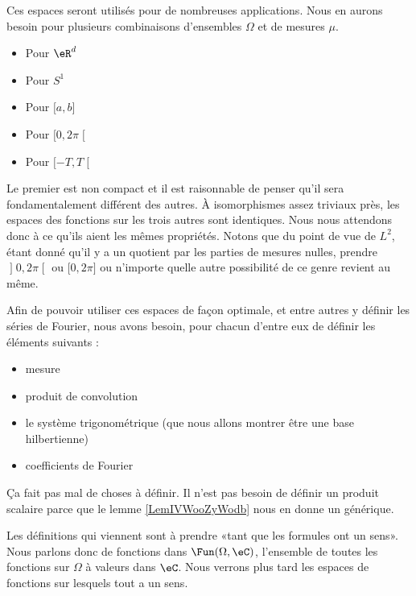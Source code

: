 \begin{normaltext}
	Ces espaces seront utilisés pour de nombreuses applications. Nous en aurons besoin pour plusieurs combinaisons d'ensembles \( \Omega\) et de mesures \( \mu\).
	\begin{itemize}
		\item Pour \( \eR^d\)
		\item Pour \( S^1\)
		\item Pour \( \mathopen[ a , b \mathclose]\)
		\item Pour \( \mathopen[ 0 , 2\pi \mathclose[\)
		\item Pour \( \mathopen[ -T , T \mathclose[\)
	\end{itemize}
	Le premier est non compact et il est raisonnable de penser qu'il sera fondamentalement différent des autres. À isomorphismes assez triviaux près, les espaces des fonctions sur les trois autres sont identiques. Nous nous attendons donc à ce qu'ils aient les mêmes propriétés. Notons que du point de vue de \( L^2\), étant donné qu'il y a un quotient par les parties de mesures nulles, prendre \( \mathopen] 0 , 2\pi \mathclose[\) ou \( \mathopen[ 0 , 2\pi \mathclose]\) ou n'importe quelle autre possibilité de ce genre revient au même.

	Afin de pouvoir utiliser ces espaces de façon optimale, et entre autres y définir les séries de Fourier, nous avons besoin, pour chacun d'entre eux de définir les éléments suivants :
	\begin{itemize}
		\item mesure
		\item produit de convolution
		\item le système trigonométrique (que nous allons montrer être une base hilbertienne)
		\item coefficients de Fourier
	\end{itemize}
	Ça fait pas mal de choses à définir. Il n'est pas besoin de définir un produit scalaire parce que le lemme \ref{LemIVWooZyWodb} nous en donne un générique.

	Les définitions qui viennent sont à prendre «tant que les formules ont un sens». Nous parlons donc de fonctions dans \( \Fun(\Omega,\eC)\), l'ensemble de toutes les fonctions sur \( \Omega\) à valeurs dans \( \eC\). Nous verrons plus tard les espaces de fonctions sur lesquels tout a un sens.
\end{normaltext}

